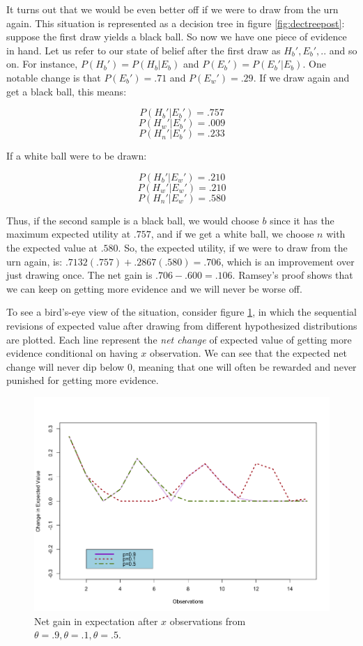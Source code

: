 It turns out that we would be even better off if we were to draw from
the urn again. This situation is represented as a decision tree in figure \ref{fig:dectreepost}: suppose the first draw yields a black ball. So now we
have one piece of evidence in hand. Let us refer to our state of belief
after the first draw as \(H_b', E_b',..\) and so on. For instance,
\(P(H_b') = P(H_b|E_b)\) and \(P(E_b') = P(E_b'|E_b)\). One notable
change is that \(P(E_b') = .71\) and \(P(E_w')=.29\). If we draw
again and get a black ball, this means:

\[P(H_b'|E_b') = .757\] \[P(H_w'|E_b') = .009\]
\[P(H_n'|E_b') = .233\]

If a white ball were to be drawn:

\[P(H_b'|E_w') = .210\] \[P(H_w'|E_w') = .210\] \[P(H_n'|E_w') = .580\]

Thus, if the second sample is a black ball, we would choose \(b\) since
it has the maximum expected utility at \(.757\), and if we get a white
ball, we choose \(n\) with the expected value at \(.580\). So, the
expected utility, if we were to draw from the urn again, is:
\(.7132(.757) + .2867(.580) = .706\), which is an improvement over
just drawing once. The net gain is \(.706 -.600 = .106\). Ramsey's
proof shows that we can keep on getting more evidence and we will never
be worse off. 

To see a bird's-eye view of the situation, consider figure \ref{fig:expectedchange}, in which the sequential revisions of expected value after drawing from different hypothesized distributions are plotted. Each line represent the \emph{net change} of expected value of getting more evidence conditional on having $x$ observation. We can see that the expected net change will never dip below $0$, meaning that one will often be rewarded and never punished for getting more evidence.

\begin{figure}[h] 
\begin{center}
\includegraphics[scale=0.5]{Expectedchange.png}
	\caption{Net gain in expectation after $x$ observations from $\theta=.9,\theta=.1,\theta=.5$. }
	\label{fig:expectedchange}
\end{center}	
\end{figure}



